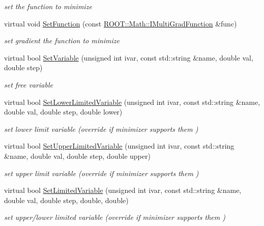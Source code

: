 \begin{DoxyCompactItemize}
\begin{DoxyCompactList}\small\item\em set the function to minimize \end{DoxyCompactList}\item 
virtual void \mbox{\hyperlink{classROOT_1_1Minuit2_1_1Minuit2Minimizer_aeb98c40cf3486fe8fb9bec4da0f7942e}{Set\+Function}} (const \mbox{\hyperlink{namespaceROOT_1_1Math_a014e019aaf9304a00e9231bd9ed232fb}{R\+O\+O\+T\+::\+Math\+::\+I\+Multi\+Grad\+Function}} \&func)
\begin{DoxyCompactList}\small\item\em set gradient the function to minimize \end{DoxyCompactList}\item 
virtual bool \mbox{\hyperlink{classROOT_1_1Minuit2_1_1Minuit2Minimizer_a951ad856f74ded3c64836fa28fdf9bb5}{Set\+Variable}} (unsigned int ivar, const std\+::string \&name, double val, double step)
\begin{DoxyCompactList}\small\item\em set free variable \end{DoxyCompactList}\item 
virtual bool \mbox{\hyperlink{classROOT_1_1Minuit2_1_1Minuit2Minimizer_af38926946e36f7030cfc1c298ab9b222}{Set\+Lower\+Limited\+Variable}} (unsigned int ivar, const std\+::string \&name, double val, double step, double lower)
\begin{DoxyCompactList}\small\item\em set lower limit variable (override if minimizer supports them ) \end{DoxyCompactList}\item 
virtual bool \mbox{\hyperlink{classROOT_1_1Minuit2_1_1Minuit2Minimizer_a70209b37c419af5d8d1475ce8de29b43}{Set\+Upper\+Limited\+Variable}} (unsigned int ivar, const std\+::string \&name, double val, double step, double upper)
\begin{DoxyCompactList}\small\item\em set upper limit variable (override if minimizer supports them ) \end{DoxyCompactList}\item 
virtual bool \mbox{\hyperlink{classROOT_1_1Minuit2_1_1Minuit2Minimizer_a30385295df6a6b784aa59de7f00e4d23}{Set\+Limited\+Variable}} (unsigned int ivar, const std\+::string \&name, double val, double step, double, double)
\begin{DoxyCompactList}\small\item\em set upper/lower limited variable (override if minimizer supports them ) \end{DoxyCompactList}\item 

\end{DoxyCompactItemize}
